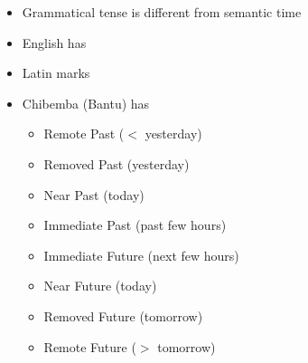 \documentclass[a4paper,landscape,headrule,footrule,xetex]{foils}
\begin{document}
\begin{itemize}
\item  Grammatical tense is different from semantic time
\item  English has 
\item  Latin marks 
\item  Chibemba (Bantu) has 
  \begin{multicols}{2}
  \begin{itemize}
  \item  Remote Past ($<$ yesterday)
  \item  Removed Past (yesterday)
  \item  Near Past (today)
  \item  Immediate Past (past few hours)
  \item Immediate Future (next few hours)
  \item Near Future (today)
  \item Removed Future (tomorrow)
  \item Remote Future ($>$ tomorrow)
  \end{itemize}
\end{multicols}
\end{itemize}
\end{document}
